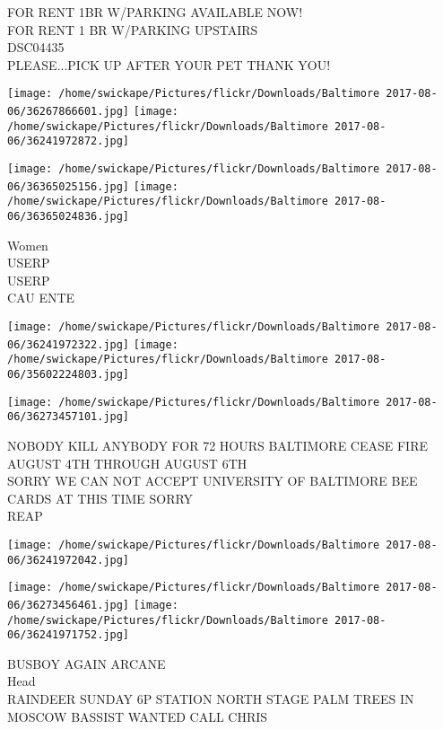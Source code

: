 \documentclass[10pt,letterpaper]{article}
\begin{document}
FOR RENT 1BR W/PARKING AVAILABLE NOW!\\
FOR RENT 1 BR W/PARKING UPSTAIRS\\
DSC04435\\
PLEASE...PICK UP AFTER YOUR PET THANK YOU!\\
\pagebreak

\texttt{[image: /home/swickape/Pictures/flickr/Downloads/Baltimore 2017-08-06/36267866601.jpg]}
\texttt{[image: /home/swickape/Pictures/flickr/Downloads/Baltimore 2017-08-06/36241972872.jpg]}

\texttt{[image: /home/swickape/Pictures/flickr/Downloads/Baltimore 2017-08-06/36365025156.jpg]}
\texttt{[image: /home/swickape/Pictures/flickr/Downloads/Baltimore 2017-08-06/36365024836.jpg]}

Women\\
USERP\\
USERP\\
CAU ENTE\\
\pagebreak

\texttt{[image: /home/swickape/Pictures/flickr/Downloads/Baltimore 2017-08-06/36241972322.jpg]}
\texttt{[image: /home/swickape/Pictures/flickr/Downloads/Baltimore 2017-08-06/35602224803.jpg]}

\texttt{[image: /home/swickape/Pictures/flickr/Downloads/Baltimore 2017-08-06/36273457101.jpg]}

NOBODY KILL ANYBODY FOR 72 HOURS BALTIMORE CEASE FIRE AUGUST 4TH THROUGH AUGUST 6TH\\
SORRY WE CAN NOT ACCEPT UNIVERSITY OF BALTIMORE BEE CARDS AT THIS TIME SORRY\\
REAP\\
\pagebreak

\texttt{[image: /home/swickape/Pictures/flickr/Downloads/Baltimore 2017-08-06/36241972042.jpg]}

\vspace{0.25in}
\texttt{[image: /home/swickape/Pictures/flickr/Downloads/Baltimore 2017-08-06/36273456461.jpg]}
\texttt{[image: /home/swickape/Pictures/flickr/Downloads/Baltimore 2017-08-06/36241971752.jpg]}

BUSBOY AGAIN ARCANE\\
Head\\
RAINDEER SUNDAY 6P STATION NORTH STAGE PALM TREES IN MOSCOW BASSIST WANTED CALL CHRIS\\
\pagebreak
\end{document}
